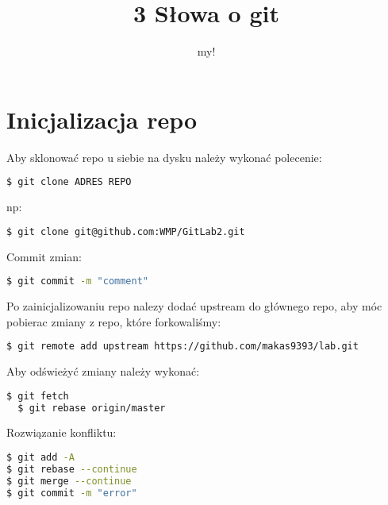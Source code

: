 ﻿\documentclass[12pt,a4paper]{book}
\author{my!}
\title{3 Słowa o git}
\begin{document}
\maketitle

\chapter{Inicjalizacja repo}
Aby sklonować repo u siebie na dysku należy wykonać polecenie:
\begin{lstlisting}[language=bash]
  $ git clone ADRES REPO
\end{lstlisting}
np:
\begin{lstlisting}[language=bash]
  $ git clone git@github.com:WMP/GitLab2.git
\end{lstlisting}

Commit zmian:
\begin{lstlisting}[language=bash]
  $ git commit -m "comment"
\end{lstlisting}

Po zainicjalizowaniu repo nalezy dodać upstream do głównego repo, aby móc pobierac zmiany z repo, które forkowaliśmy:
\begin{lstlisting}[language=bash]
  $ git remote add upstream https://github.com/makas9393/lab.git
\end{lstlisting}

Aby odświeżyć zmiany należy wykonać:
\begin{lstlisting}[language=bash]
  $ git fetch
  $ git rebase origin/master
\end{lstlisting}

Rozwiązanie konfliktu:
\begin{lstlisting}[language=bash]
$ git add -A
$ git rebase --continue
$ git merge --continue
$ git commit -m "error"
\end{lstlisting}
\end{document}
